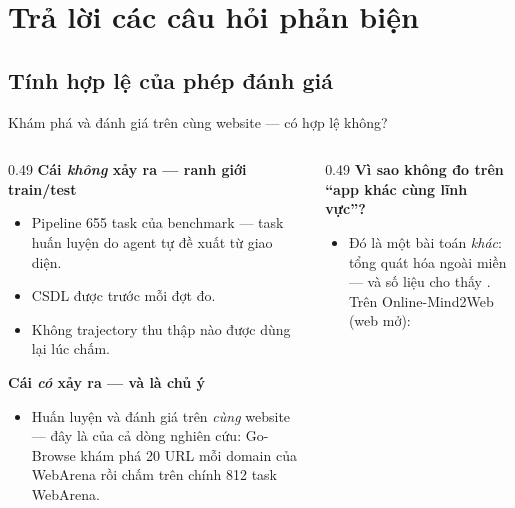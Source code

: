
\section{Trả lời các câu hỏi phản biện}

\subsection{Tính hợp lệ của phép đánh giá}
\begin{frame}{Khám phá và đánh giá trên cùng website --- có hợp lệ không?}
  \footnotesize
  \begin{columns}[t]
    \begin{column}{0.49\textwidth}
      \textbf{Cái \emph{không} xảy ra --- ranh giới train/test}
      \scriptsize
      \begin{itemize}\setlength{\itemsep}{2pt}
        \item Pipeline  655 task của benchmark --- task huấn
              luyện do agent tự đề xuất từ giao diện.
        \item CSDL được  trước mỗi đợt đo.
        \item Không trajectory thu thập nào được dùng lại lúc chấm.
      \end{itemize}
      \vspace{0.04cm}
      \textbf{Cái \emph{có} xảy ra --- và là chủ ý}
      \scriptsize
      \begin{itemize}\setlength{\itemsep}{2pt}
        \item Huấn luyện và đánh giá trên \emph{cùng} website --- đây là
               của cả dòng nghiên cứu: Go-Browse khám phá 20 URL
              mỗi domain của WebArena rồi chấm trên chính 812 task WebArena.
      \end{itemize}
    \end{column}
    \begin{column}{0.49\textwidth}
      \textbf{Vì sao không đo trên ``app khác cùng lĩnh vực''?}
      \scriptsize
      \begin{itemize}\setlength{\itemsep}{2pt}
        \item Đó là một bài toán \emph{khác}: tổng quát hóa ngoài miền --- và số liệu
              cho thấy . Trên Online-Mind2Web (web mở):
        \end{itemize}

\end{column}
\end{columns}
\end{frame}
